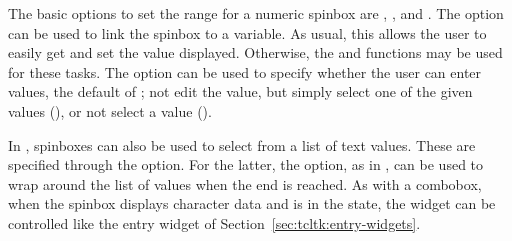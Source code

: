 The basic options  to set the range for a numeric spinbox are , , and .  The  option can be used to link the spinbox to a \TCL\/ variable. As usual, this allows the user to easily get and set the value displayed. Otherwise, the  and  functions may be used for these tasks. The option  can be used to specify whether the user can enter values, the default of ; not edit the value, but simply select one of the given values (), or not select a value ().

In \TK, spinboxes can also be used to select from a list of text values. These are specified through the  option. For the latter, the  option, as in , can be used to wrap around the list of values when the end is reached. As with a combobox, when the \TK\/ spinbox displays character data and is in the  state, the widget can be controlled like the entry widget of Section~\ref{sec:tcltk:entry-widgets}.


